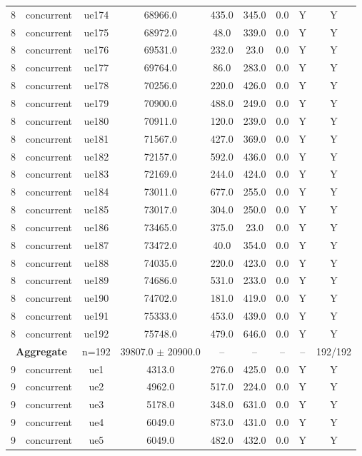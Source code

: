 \begin{table}[ht]
\begin{tabular}{|c|c|c|c|c|c|c|c|c|}
8 & concurrent & ue174 & 68966.0 & 435.0 & 345.0 & 0.0 & Y & Y \\
8 & concurrent & ue175 & 68972.0 & 48.0 & 339.0 & 0.0 & Y & Y \\
8 & concurrent & ue176 & 69531.0 & 232.0 & 23.0 & 0.0 & Y & Y \\
8 & concurrent & ue177 & 69764.0 & 86.0 & 283.0 & 0.0 & Y & Y \\
8 & concurrent & ue178 & 70256.0 & 220.0 & 426.0 & 0.0 & Y & Y \\
8 & concurrent & ue179 & 70900.0 & 488.0 & 249.0 & 0.0 & Y & Y \\
8 & concurrent & ue180 & 70911.0 & 120.0 & 239.0 & 0.0 & Y & Y \\
8 & concurrent & ue181 & 71567.0 & 427.0 & 369.0 & 0.0 & Y & Y \\
8 & concurrent & ue182 & 72157.0 & 592.0 & 436.0 & 0.0 & Y & Y \\
8 & concurrent & ue183 & 72169.0 & 244.0 & 424.0 & 0.0 & Y & Y \\
8 & concurrent & ue184 & 73011.0 & 677.0 & 255.0 & 0.0 & Y & Y \\
8 & concurrent & ue185 & 73017.0 & 304.0 & 250.0 & 0.0 & Y & Y \\
8 & concurrent & ue186 & 73465.0 & 375.0 & 23.0 & 0.0 & Y & Y \\
8 & concurrent & ue187 & 73472.0 & 40.0 & 354.0 & 0.0 & Y & Y \\
8 & concurrent & ue188 & 74035.0 & 220.0 & 423.0 & 0.0 & Y & Y \\
8 & concurrent & ue189 & 74686.0 & 531.0 & 233.0 & 0.0 & Y & Y \\
8 & concurrent & ue190 & 74702.0 & 181.0 & 419.0 & 0.0 & Y & Y \\
8 & concurrent & ue191 & 75333.0 & 453.0 & 439.0 & 0.0 & Y & Y \\
8 & concurrent & ue192 & 75748.0 & 479.0 & 646.0 & 0.0 & Y & Y \\
\multicolumn{2}{|c|}{\textbf{Aggregate}} & n=192 & 39807.0 $\pm$ 20900.0 & -- & -- & -- & -- & 192/192 \\
\hline
9 & concurrent & ue1 & 4313.0 & 276.0 & 425.0 & 0.0 & Y & Y \\
9 & concurrent & ue2 & 4962.0 & 517.0 & 224.0 & 0.0 & Y & Y \\
9 & concurrent & ue3 & 5178.0 & 348.0 & 631.0 & 0.0 & Y & Y \\
9 & concurrent & ue4 & 6049.0 & 873.0 & 431.0 & 0.0 & Y & Y \\
9 & concurrent & ue5 & 6049.0 & 482.0 & 432.0 & 0.0 & Y & Y \\

\end{tabular}
\end{table}

